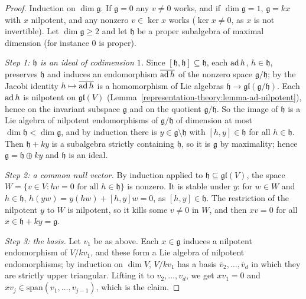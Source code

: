 \begin{proof}
Induction on $\dim\mathfrak{g}$. If $\mathfrak{g} = 0$ any $v \neq 0$ works, and if $\dim\mathfrak{g} = 1$, $\mathfrak{g} = kx$ with $x$ nilpotent, and any nonzero
$v \in \ker x$ works ($\ker x \neq 0$, as $x$ is not invertible). Let $\dim\mathfrak{g} \geq 2$ and let $\mathfrak{h}$ be a proper subalgebra of maximal dimension
(for instance $0$ is proper).

\emph{Step 1: $\mathfrak{h}$ is an ideal of codimension $1$.} Since $[\mathfrak{h}, \mathfrak{h}] \subseteq \mathfrak{h}$, each $\operatorname{ad} h$, $h \in \mathfrak{h}$, preserves
$\mathfrak{h}$ and induces an endomorphism $\overline{\operatorname{ad} h}$ of the nonzero space $\mathfrak{g}/\mathfrak{h}$; by the Jacobi identity $h \mapsto \overline{\operatorname{ad} h}$ is a
homomorphism of Lie algebras $\mathfrak{h} \to \mathfrak{gl}(\mathfrak{g}/\mathfrak{h})$. Each $\operatorname{ad} h$ is nilpotent on $\mathfrak{gl}(V)$
(Lemma~\ref{representation-theory:lemma-ad-nilpotent}), hence on the invariant subspace $\mathfrak{g}$ and on the quotient $\mathfrak{g}/\mathfrak{h}$. So the image of
$\mathfrak{h}$ is a Lie algebra of nilpotent endomorphisms of $\mathfrak{g}/\mathfrak{h}$ of dimension at most $\dim\mathfrak{h} < \dim\mathfrak{g}$, and by induction
there is $y \in \mathfrak{g} \setminus \mathfrak{h}$ with $[h, y] \in \mathfrak{h}$ for all $h \in \mathfrak{h}$. Then $\mathfrak{h} + ky$ is a subalgebra strictly
containing $\mathfrak{h}$, so it is $\mathfrak{g}$ by maximality; hence $\mathfrak{g} = \mathfrak{h} \oplus ky$ and $\mathfrak{h}$ is an ideal.

\emph{Step 2: a common null vector.} By induction applied to $\mathfrak{h} \subseteq \mathfrak{gl}(V)$, the space $W = \{v \in V : hv = 0 \text{ for all } h \in \mathfrak{h}\}$
is nonzero. It is stable under $y$: for $w \in W$ and $h \in \mathfrak{h}$, $h(yw) = y(hw) + [h, y]w = 0$, as $[h, y] \in \mathfrak{h}$. The restriction of the nilpotent
$y$ to $W$ is nilpotent, so it kills some $v \neq 0$ in $W$, and then $xv = 0$ for all $x \in \mathfrak{h} + ky = \mathfrak{g}$.

\emph{Step 3: the basis.} Let $v_1$ be as above. Each $x \in \mathfrak{g}$ induces a nilpotent endomorphism of $V/kv_1$, and these form a Lie algebra of nilpotent
endomorphisms; by induction on $\dim V$, $V/kv_1$ has a basis $\bar v_2, \ldots, \bar v_d$ in which they are strictly upper triangular. Lifting it to $v_2, \ldots, v_d$,
we get $xv_1 = 0$ and $xv_j \in \mathrm{span}(v_1, \ldots, v_{j-1})$, which is the claim.
\end{proof}

